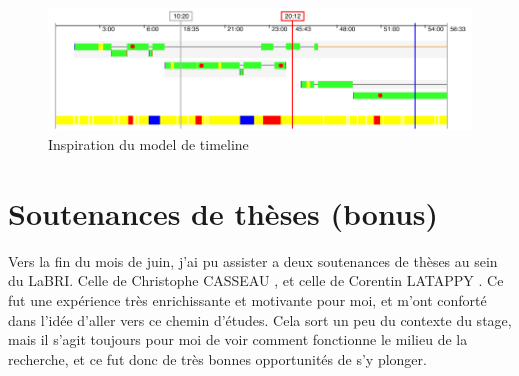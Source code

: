 \begin{figure}
  \centering
  \includegraphics[width=15cm]{images/ref-timeline.png}
  \caption{Inspiration du model de timeline \cite{cool-plot}}
  \label{ref-timeline}
\end{figure}


\newpage
\section{Soutenances de thèses (bonus)}

Vers la fin du mois de juin, j'ai pu assister a deux soutenances de thèses au sein du LaBRI.
Celle de Christophe CASSEAU \cite{these-casseau}, et celle de Corentin LATAPPY \cite{these-latappy}.
Ce fut une expérience très enrichissante et motivante pour moi, et m'ont conforté dans l'idée d'aller vers ce chemin d'études.
Cela sort un peu du contexte du stage, mais il s'agit toujours pour moi de voir comment fonctionne le milieu de la recherche, et ce fut donc de très bonnes opportunités de s'y plonger.
